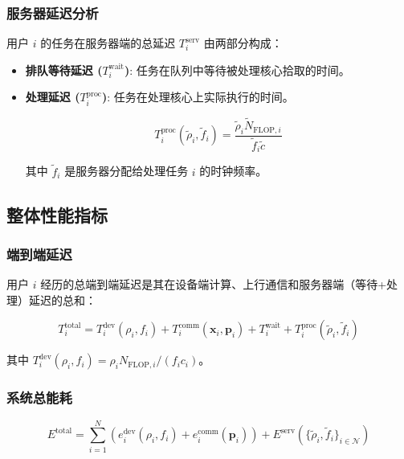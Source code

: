\documentclass[11pt, a4paper]{article}
\begin{document}
\subsubsection{服务器延迟分析}

用户 $i$ 的任务在服务器端的总延迟 $T_i^{\text{serv}}$ 由两部分构成：

\begin{itemize}
\item \textbf{排队等待延迟 ($T_i^{\text{wait}}$)}: 任务在队列中等待被处理核心拾取的时间。

\item \textbf{处理延迟 ($T_i^{\text{proc}}$)}: 任务在处理核心上实际执行的时间。

\begin{equation}
T_i^{\text{proc}}(\tilde{\rho}_i, \tilde{f}_i) = \frac{\tilde{\rho}_i \tilde{N}_{\text{FLOP},i}}{\tilde{f}_i \tilde{c}}
\end{equation}

其中 $\tilde{f}_i$ 是服务器分配给处理任务 $i$ 的时钟频率。
\end{itemize}

\subsection{整体性能指标}

\subsubsection{端到端延迟}

用户 $i$ 经历的总端到端延迟是其在设备端计算、上行通信和服务器端（等待+处理）延迟的总和：

\begin{equation}
T_i^{\text{total}} = T_i^{\text{dev}}(\rho_i, f_i) + T_i^{\text{comm}}(\mathbf{x}_i, \mathbf{p}_i) + T_i^{\text{wait}} + T_i^{\text{proc}}(\tilde{\rho}_i, \tilde{f}_i)
\end{equation}

其中 $T_i^{\text{dev}}(\rho_i, f_i) = \rho_i N_{\text{FLOP},i} / (f_i c_i)$。

\subsubsection{系统总能耗}

\begin{equation}
E^{\text{total}} = \sum_{i=1}^N \left( e_i^{\text{dev}}(\rho_i, f_i) + e_i^{\text{comm}}(\mathbf{p}_i) \right) + E^{\text{serv}}(\{\tilde{\rho}_i, \tilde{f}_i\}_{i \in \mathcal{N}})
\end{equation}
\end{document}
